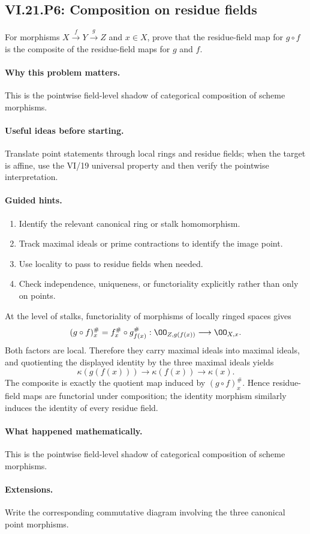 \subsection*{VI.21.P6: Composition on residue fields}
\begin{problem}\label{prob:vi21-p06}
For morphisms $X\xrightarrow{f}Y\xrightarrow{g}Z$ and $x\in X$, prove that the residue-field map for $g\circ f$ is the composite of the residue-field maps for $g$ and $f$.
\end{problem}

\ifdefined\FullProblemDossiers
\paragraph{Why this problem matters.}
This is the pointwise field-level shadow of categorical composition of scheme morphisms.

\paragraph{Useful ideas before starting.}
Translate point statements through local rings and residue fields; when the target is affine, use the VI/19 universal property and then verify the pointwise interpretation.

\paragraph{Guided hints.}
\begin{enumerate}
\item Identify the relevant canonical ring or stalk homomorphism.
\item Track maximal ideals or prime contractions to identify the image point.
\item Use locality to pass to residue fields when needed.
\item Check independence, uniqueness, or functoriality explicitly rather than only on points.
\end{enumerate}

\begin{solution}
At the level of stalks, functoriality of morphisms of locally ringed spaces gives
\[
(g\circ f)_x^\#
=f_x^\#\circ g_{f(x)}^\#:
\OO_{Z,g(f(x))}\longrightarrow\OO_{X,x}.
\]
Both factors are local.  Therefore they carry maximal ideals into maximal ideals, and quotienting
the displayed identity by the three maximal ideals yields
\[
\kappa(g(f(x)))\longrightarrow\kappa(f(x))\longrightarrow\kappa(x).
\]
The composite is exactly the quotient map induced by $(g\circ f)_x^\#$.  Hence residue-field maps
are functorial under composition; the identity morphism similarly induces the identity of every
residue field.
\end{solution}

\paragraph{What happened mathematically.}
This is the pointwise field-level shadow of categorical composition of scheme morphisms.

\paragraph{Extensions.}
Write the corresponding commutative diagram involving the three canonical point morphisms.
\fi
